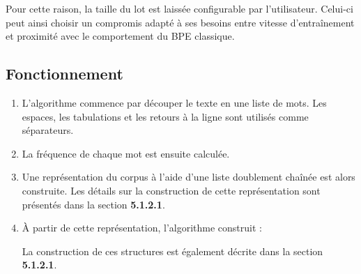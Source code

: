 \documentclass[12pt,a4paper]{report}
\begin{document}
	Pour cette raison, la taille du lot est laissée configurable par l’utilisateur. Celui-ci peut ainsi choisir un compromis adapté à ses besoins entre vitesse d’entraînement et proximité avec le comportement du BPE classique.
	
	\subsection{Fonctionnement}
	
	\begin{enumerate}
		\item L'algorithme commence par découper le texte en une liste de mots. Les espaces, les tabulations et les retours à la ligne sont utilisés comme séparateurs.
		
		\item La fréquence de chaque mot est ensuite calculée.
		
		\item Une représentation du corpus à l'aide d'une liste doublement chaînée est alors construite. Les détails sur la construction de cette représentation sont présentés dans la section \textbf{5.1.2.1}.
		
		\item À partir de cette représentation, l'algorithme construit :
		La construction de ces structures est également décrite dans la section \textbf{5.1.2.1}.
		

\end{enumerate}
\end{document}
